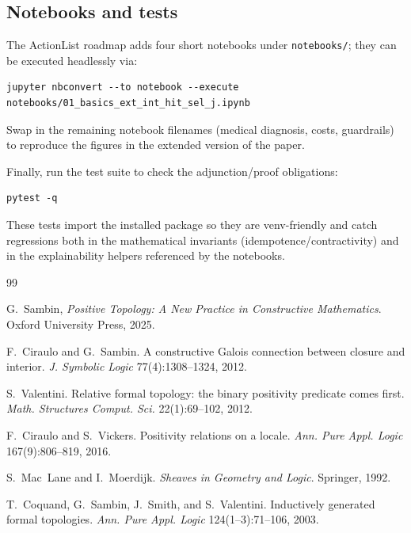 \documentclass[11pt]{article}
\theoremstyle{definition}
\theoremstyle{plain}
\begin{document}
\subsection{Notebooks and tests}

The ActionList roadmap adds four short notebooks under \texttt{notebooks/}; they can be executed headlessly via:
\begin{verbatim}
jupyter nbconvert --to notebook --execute notebooks/01_basics_ext_int_hit_sel_j.ipynb
\end{verbatim}
Swap in the remaining notebook filenames (medical diagnosis, costs, guardrails) to reproduce the figures in the extended version of the paper.

Finally, run the test suite to check the adjunction/proof obligations:
\begin{verbatim}
pytest -q
\end{verbatim}
These tests import the installed package so they are venv-friendly and catch regressions both in the mathematical invariants (idempotence/contractivity) and in the explainability helpers referenced by the notebooks.

\begin{thebibliography}{99}

G.~Sambin, \emph{Positive Topology: A New Practice in Constructive Mathematics}.
Oxford University Press, 2025.

F.~Ciraulo and G.~Sambin.
A constructive {G}alois connection between closure and interior.
\emph{J. Symbolic Logic} 77(4):1308--1324, 2012.

S.~Valentini.
Relative formal topology: the binary positivity predicate comes first.
\emph{Math. Structures Comput. Sci.} 22(1):69--102, 2012.

F.~Ciraulo and S.~Vickers.
Positivity relations on a locale.
\emph{Ann. Pure Appl. Logic} 167(9):806--819, 2016.

S.~Mac~Lane and I.~Moerdijk.
\emph{Sheaves in Geometry and Logic}.
Springer, 1992.

T.~Coquand, G.~Sambin, J.~Smith, and S.~Valentini.
Inductively generated formal topologies.
\emph{Ann. Pure Appl. Logic} 124(1--3):71--106, 2003.

\end{thebibliography}
\end{document}
